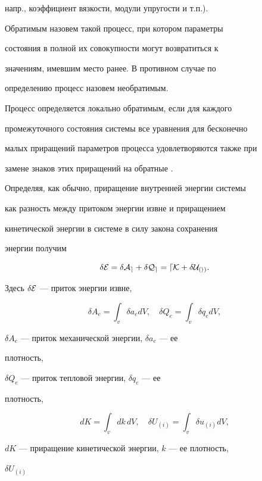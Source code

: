 напр., коэффициент вязкости, модули упругости и т.п.).


Обратимым назовем такой процесс, при котором параметры


состояния в полной их совокупности могут возвратиться к


значениям, имевшим место ранее. В противном случае по


определению процесс назовем необратимым.





Процесс определяется локально обратимым, если для каждого


промежуточного состояния системы все уравнения для бесконечно


малых приращений параметров процесса удовлетворяются также при


замене знаков этих приращений на обратные \cite{Sed}.





Определяя, как обычно, приращение внутренней энергии системы


как разность между притоком энергии извне и приращением


кинетической энергии в системе в силу закона сохранения


энергии получим


$$


\delta\cal E=\delta A_e+\delta Q_e=dK+\delta U_{(i)}.


$$


Здесь $\delta\cal E$ --- приток энергии извне,


$$


\delta A_e=\int_v \delta a_e dV,\quad


\delta Q_e=\int_v \delta q_e dV,


$$


$\delta A_e$ --- приток механической энергии, $\delta a_e$ --- ее


плотность,


$\delta Q_e$ --- приток тепловой энергии, $\delta q_e$ --- ее


плотность,


$$


dK=\int_v dk\,dV,\quad


\delta U_{(i)}=\int_v\delta u_{(i)}dV,


$$


$dK$ --- приращение кинетической энергии, $k$ --- ее плотность,


$\delta U_{(i)}$


